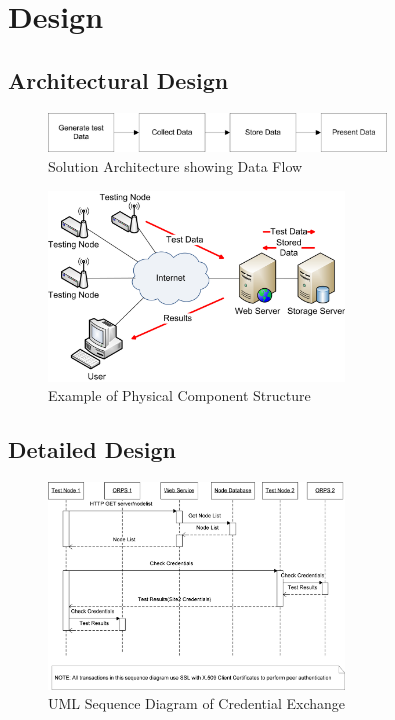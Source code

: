 \section{Design}

\subsection{Architectural Design}


\begin{figure}[htb]
\centering
\includegraphics[width=0.8\textwidth]{img/3yp-arch.png}
\caption{Solution Architecture showing Data Flow}
\label{fig:arch}
\end{figure}


\begin{figure}[htb]
\centering
\includegraphics[width=0.7\textwidth]{img/3yp-phys.png}
\caption{Example of Physical Component Structure}
\label{fig:phys}
\end{figure}

\subsection{Detailed Design}


\begin{figure}[htb]
\centering
\includegraphics[width=0.7\textwidth]{img/sec-struct-sequence.png}
\caption{UML Sequence Diagram of Credential Exchange}
\label{fig:sec-seq}
\end{figure}

